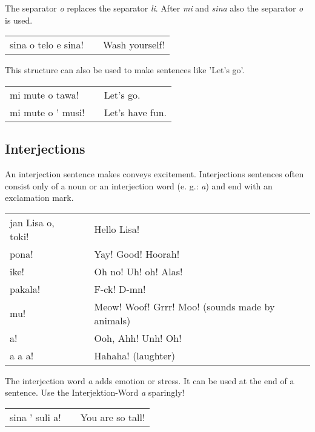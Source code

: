 The separator \textit{o} replaces the separator \textit{li}. After \textit{mi} and \textit{sina} also the separator \textit{o} is used. 

\begin{supertabular}{p{5,5cm}|ll}
sina o telo e sina! && Wash yourself! \\
\end{supertabular} 

This structure can also be used to make sentences like 'Let's go'.

\begin{supertabular}{p{5,5cm}|ll}
mi mute o tawa! && Let's go. \\
mi mute o ' musi! && Let's have fun. \\
\end{supertabular} 
%
{}
\subsection*{Interjections}
%
An interjection sentence makes conveys excitement.
Interjections sentences often consist only of a noun or an interjection word (e. g.: \textit{a}) and end with an exclamation mark.

\begin{supertabular}{p{5,5cm}|ll}
jan Lisa o, toki! && Hello Lisa! \\
pona! && Yay! Good! Hoorah! \\
ike! && Oh no! Uh! oh! Alas! \\
pakala! && F-ck! D-mn! \\
mu! && Meow! Woof! Grrr! Moo! (sounds made by animals) \\
a! && Ooh, Ahh! Unh! Oh! \\
a a a! && Hahaha! (laughter) \\
\end{supertabular} 

The interjection word \textit{a} adds emotion or stress. 
It can be used at the end of a sentence.
Use the Interjektion-Word \textit{a} sparingly!

\begin{supertabular}{p{5,5cm}|ll}
sina ' suli a! && You are so tall! \\
\end{supertabular} 

